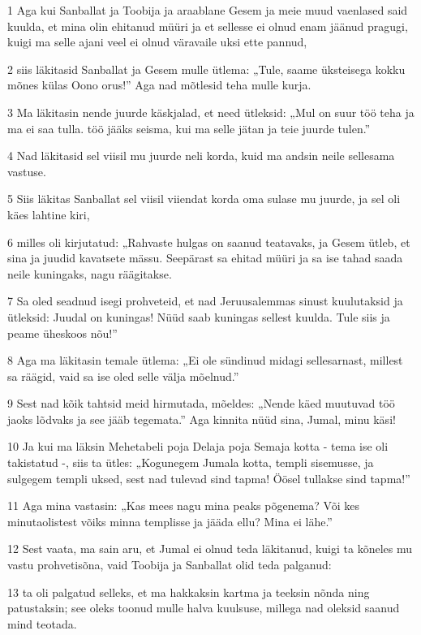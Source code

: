 \par 1 Aga kui Sanballat ja Toobija ja araablane Gesem ja meie muud vaenlased said kuulda, et mina olin ehitanud müüri ja et sellesse ei olnud enam jäänud pragugi, kuigi ma selle ajani veel ei olnud väravaile uksi ette pannud,
\par 2 siis läkitasid Sanballat ja Gesem mulle ütlema: „Tule, saame üksteisega kokku mõnes külas Oono orus!” Aga nad mõtlesid teha mulle kurja.
\par 3 Ma läkitasin nende juurde käskjalad, et need ütleksid: „Mul on suur töö teha ja ma ei saa tulla. töö jääks seisma, kui ma selle jätan ja teie juurde tulen.”
\par 4 Nad läkitasid sel viisil mu juurde neli korda, kuid ma andsin neile sellesama vastuse.
\par 5 Siis läkitas Sanballat sel viisil viiendat korda oma sulase mu juurde, ja sel oli käes lahtine kiri,
\par 6 milles oli kirjutatud: „Rahvaste hulgas on saanud teatavaks, ja Gesem ütleb, et sina ja juudid kavatsete mässu. Seepärast sa ehitad müüri ja sa ise tahad saada neile kuningaks, nagu räägitakse.
\par 7 Sa oled seadnud isegi prohveteid, et nad Jeruusalemmas sinust kuulutaksid ja ütleksid: Juudal on kuningas! Nüüd saab kuningas sellest kuulda. Tule siis ja peame üheskoos nõu!”
\par 8 Aga ma läkitasin temale ütlema: „Ei ole sündinud midagi sellesarnast, millest sa räägid, vaid sa ise oled selle välja mõelnud.”
\par 9 Sest nad kõik tahtsid meid hirmutada, mõeldes: „Nende käed muutuvad töö jaoks lõdvaks ja see jääb tegemata.” Aga kinnita nüüd sina, Jumal, minu käsi!
\par 10 Ja kui ma läksin Mehetabeli poja Delaja poja Semaja kotta - tema ise oli takistatud -, siis ta ütles: „Kogunegem Jumala kotta, templi sisemusse, ja sulgegem templi uksed, sest nad tulevad sind tapma! Öösel tullakse sind tapma!”
\par 11 Aga mina vastasin: „Kas mees nagu mina peaks põgenema? Või kes minutaolistest võiks minna templisse ja jääda ellu? Mina ei lähe.”
\par 12 Sest vaata, ma sain aru, et Jumal ei olnud teda läkitanud, kuigi ta kõneles mu vastu prohvetisõna, vaid Toobija ja Sanballat olid teda palganud:
\par 13 ta oli palgatud selleks, et ma hakkaksin kartma ja teeksin nõnda ning patustaksin; see oleks toonud mulle halva kuulsuse, millega nad oleksid saanud mind teotada.
